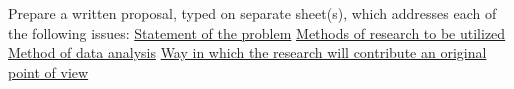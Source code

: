 \documentclass{article}
\begin{document}
\begin{flushleft}

Prepare a written proposal, typed on separate sheet(s), which addresses each of the following issues:\linebreak \linebreak
\underline{Statement of the problem}\linebreak 
\underline{Methods of research to be utilized}\linebreak 
\underline{Method of data analysis}\linebreak 
\underline{Way in which the research will contribute an original point of view}\linebreak \linebreak \linebreak
\end{flushleft}
\end{document}
